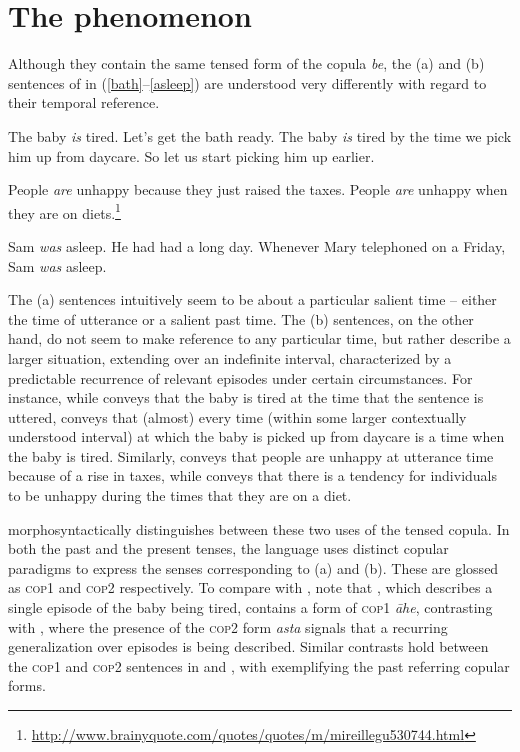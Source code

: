 \documentclass[output=paper,hidelinks]{langscibook}
\begin{document}
\section{The phenomenon}\largerpage
Although they contain the same tensed form of the copula \emph{be}, the (a) and (b) sentences of  in (\ref{bath}--\ref{asleep}) are understood very differently with regard to their temporal reference.

\ea \label{bath}
\ea The baby \emph{is} tired. Let's get the bath ready. \label{batha}
\ex The baby \emph{is} tired by the time we pick him up from daycare. So let us start picking him up earlier. \label{bathb}
\z

\ex \label{people}
\ea People \emph{are} unhappy because they just raised the taxes. \label{peoplea}
\ex People \emph{are} unhappy when they are on diets.\footnote{\url {http://www.brainyquote.com/quotes/quotes/m/mireillegu530744.html}} \label{peopleb}
\z

\ex \label{asleep}
\ea Sam \emph{was} asleep. He had had a long day.
\ex Whenever Mary telephoned on a Friday, Sam \emph{was} asleep. 
\z
\z

The (a) sentences intuitively seem to be about a particular salient time -- either the time of utterance or a salient past time. The (b) sentences, on the other hand, do not seem to make reference to any particular time, but rather describe a larger situation, extending over an indefinite interval, characterized by a predictable recurrence of relevant episodes under certain circumstances.
For instance, while  conveys that the baby is tired at the time that the sentence is uttered,  conveys that (almost) every time (within some larger contextually understood interval) at which the baby is picked up from daycare is a time when the baby is tired. Similarly,  conveys that people are unhappy at utterance time because of a rise in taxes, while  conveys that there is a tendency for individuals to be unhappy during the times that they are on a diet.\largerpage

 morphosyntactically distinguishes between these two uses of the  tensed copula. In both the past and the present tenses, the language uses distinct copular paradigms to express the senses corresponding to (a) and (b). These are glossed as \textsc{cop1} and \textsc{cop2} respectively.
To compare with , note that , which describes a single episode of the baby being tired, contains a form of \textsc{cop1} \emph{āhe}, contrasting with , where the presence of the \textsc{cop2} form \emph{asta} signals that a recurring generalization over episodes is being described. Similar contrasts hold between the \textsc{cop1} and \textsc{cop2} sentences in  and , with  exemplifying the past referring copular forms.
\end{document}
